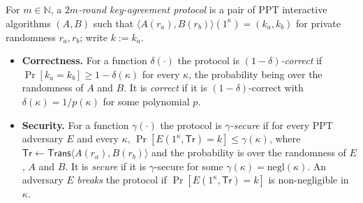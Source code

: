 \documentclass{aicr-conjecture}
\newcommand{\Trans}{\mathsf{Trans}}
\newcommand{\Trc}{\mathsf{Tr}}
\newcommand{\negl}{\mathrm{negl}}
\begin{document}
\begin{definition}\label{def:ka}
For $m\in\mathbb{N}$, a \emph{$2m$-round key-agreement protocol} is a pair
of PPT interactive algorithms $(A,B)$ such that
$\langle A(r_a),B(r_b)\rangle(1^{\kappa})=(k_a,k_b)$ for private
randomness $r_a,r_b$; write $k:=k_a$.
\begin{itemize}
\item \textbf{Correctness.} For a function $\delta(\cdot)$ the protocol is
  \emph{$(1-\delta)$-correct} if $\Pr[k_a=k_b]\ge 1-\delta(\kappa)$ for
  every $\kappa$, the probability being over the randomness of $A$ and
  $B$. It is \emph{correct} if it is $(1-\delta)$-correct with
  $\delta(\kappa)=1/p(\kappa)$ for some polynomial $p$.
\item \textbf{Security.} For a function $\gamma(\cdot)$ the protocol is
  \emph{$\gamma$-secure} if for every PPT adversary $E$ and every
  $\kappa$, $\Pr[E(1^{\kappa},\Trc)=k]\le\gamma(\kappa)$, where
  $\Trc\leftarrow\Trans\langle A(r_a),B(r_b)\rangle$ and the probability
  is over the randomness of $E$, $A$ and $B$. It is \emph{secure} if it is
  $\gamma$-secure for some $\gamma(\kappa)=\negl(\kappa)$. An adversary
  $E$ \emph{breaks} the protocol if $\Pr[E(1^{\kappa},\Trc)=k]$ is
  non-negligible in $\kappa$.
\end{itemize}
\end{definition}
\end{document}
